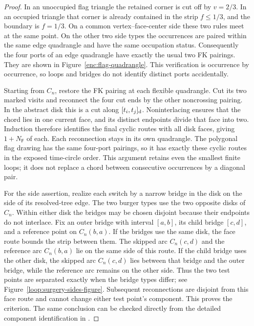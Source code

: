 \documentclass[11pt]{article}
\numberwithin{equation}{section}
\theoremstyle{definition}
\theoremstyle{remark}
\newcommand{\1}{\mathbf 1}
\begin{document}
\begin{proof}
In an unoccupied flag triangle the retained corner is cut off by
$v=2/3$.  In an occupied triangle that corner is already contained in the
strip $f\le1/3$, and the boundary is $f=1/3$.  On a common
vertex--face-center side these two rules meet at the same point.  On the
other two side types the occurrences are paired within the same edge
quadrangle and have the same occupation status.  Consequently the four
ports of an edge quadrangle have exactly the usual two FK pairings.
They are shown in Figure~\ref{enc:flag-quadrangle}.
This verification is occurrence by occurrence, so loops and bridges do
not identify distinct ports accidentally.

Starting from $C_n$, restore the FK pairing at each flexible quadrangle.
Cut its two marked visits and reconnect the four cut ends by the other
noncrossing pairing.  In the abstract disk this is a cut along
$[t_i,t_j]_{\rm d}$.  Noninterlacing ensures that the chord lies in one
current face, and its distinct endpoints divide that face into two.
Induction therefore identifies the final cyclic routes with all disk
faces, giving $1+N_{\mathsf F}$ of each.  Each reconnection stays in its
own quadrangle.  The polygonal flag drawing has the same four-port
pairings, so it has exactly these cyclic routes in the exposed
time-circle order.  This argument retains even the smallest finite
loops; it does not replace a chord between consecutive occurrences by
a diagonal pair.

For the side assertion, realize each switch by a narrow bridge in the
disk on the side of its resolved-tree edge.  The two burger types use
the two opposite disks of $C_n$.  Within either disk the bridges may
be chosen disjoint because their endpoints do not interlace.
Fix an outer bridge with interval $[a,b]$, its child bridge $[c,d]$,
and a reference point on $C_n(b,a)$.  If the bridges use the same disk,
the face route bounds the strip between them.  The skipped arc
$C_n(c,d)$ and the reference arc $C_n(b,a)$ lie on the same side of
this route.  If the child bridge uses the other disk, the skipped arc
$C_n(c,d)$ lies between that bridge and the outer bridge, while the
reference arc remains on the other side.  Thus the two test points
are separated exactly when the bridge types differ; see
Figure~\ref{loop:surgery-sides-figure}.  Subsequent reconnections are
disjoint from this face route and cannot change either test point's
component.  This proves the criterion.  The
same conclusion can be checked directly from the detailed component
identification in \cite[Lemmas~2.7 and~2.9]{GwynneMaoSunFKI}.
\end{proof}
\end{document}
